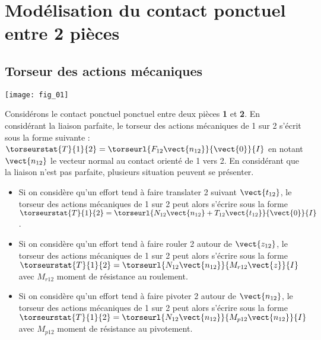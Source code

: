 %






\section{Modélisation du contact ponctuel entre 2 pièces}
\subsection{Torseur des actions mécaniques}
\begin{marginfigure}%
\begin{center}
\texttt{[image: fig\_01]}
\end{center}
\end{marginfigure}
Considérons le contact ponctuel ponctuel entre deux pièces \textbf{1} et \textbf{2}. En considérant la liaison parfaite, le torseur des actions mécaniques de 1 sur 2 s'écrit sous la forme suivante : $\torseurstat{T}{1}{2}=\torseurl{F_{12} \vect{n_{12}}}{\vect{0}}{I}$ en notant $\vect{n_{12}}$ le vecteur normal au contact orienté de 1 vers 2. 
En considérant que la liaison n'est pas parfaite, plusieurs situation peuvent se présenter.  


\begin{itemize}
\item Si on considère qu'un effort tend à faire translater 2 suivant $\vect{t_{12}}$, le torseur des actions mécaniques de 1 sur 2 peut alors s'écrire sous la forme $\torseurstat{T}{1}{2}=\torseurl{N_{12} \vect{n_{12}}+T_{12} \vect{t_{12}}}{\vect{0}}{I}$.
\item Si on considère qu'un effort tend à faire rouler 2 autour de $\vect{z_{12}}$, le torseur des actions mécaniques de 1 sur 2 peut alors s'écrire sous la forme $\torseurstat{T}{1}{2}=\torseurl{N_{12} \vect{n_{12}}}{M_{r12} \vect{z}}{I}$ avec $M_{r12}$ moment de résistance au roulement.
\item Si on considère qu'un effort tend à faire pivoter 2 autour de $\vect{n_{12}}$, le torseur des actions mécaniques de 1 sur 2 peut alors s'écrire sous la forme $\torseurstat{T}{1}{2}=\torseurl{N_{12} \vect{n_{12}}}{M_{p12} \vect{n_{12}}}{I}$ avec $M_{p12}$ moment de résistance au pivotement.
\end{itemize}

